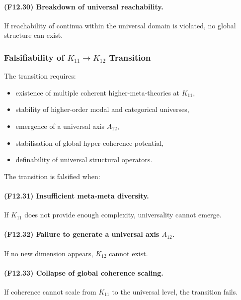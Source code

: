 \paragraph{(F12.30) Breakdown of universal reachability.}
If reachability of continua within the universal domain is violated,
no global structure can exist.



\subsubsection{Falsifiability of $K_{11} \to K_{12}$ Transition}

The transition requires:

\begin{itemize}
    \item existence of multiple coherent higher-meta-theories at $K_{11}$,
    \item stability of higher-order modal and categorical universes,
    \item emergence of a universal axis $A_{12}$,
    \item stabilisation of global hyper-coherence potential,
    \item definability of universal structural operators.
\end{itemize}

The transition is falsified when:

\paragraph{(F12.31) Insufficient meta-meta diversity.}
If $K_{11}$ does not provide enough complexity, universality cannot emerge.

\paragraph{(F12.32) Failure to generate a universal axis $A_{12}$.}
If no new dimension appears, $K_{12}$ cannot exist.

\paragraph{(F12.33) Collapse of global coherence scaling.}
If coherence cannot scale from $K_{11}$ to the universal level,
the transition fails.

